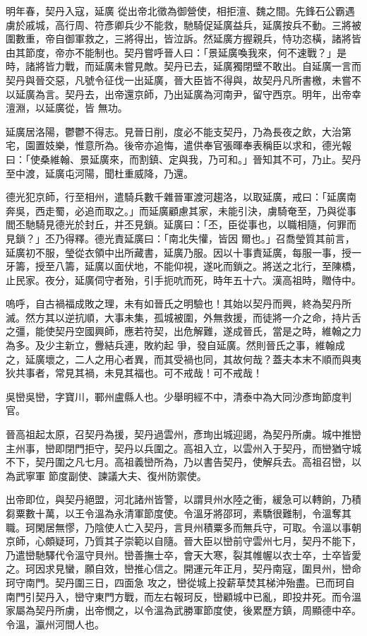 \begin{pinyinscope}
 明年春，契丹入寇，延廣
 從出帝北徵為御營使，相拒澶、魏之間。先鋒石公霸遇虜於戚城，高行周、符彥卿兵少不能救，馳騎促延廣益兵，延廣按兵不動。三將被圍數重，帝自御軍救之，三將得出，皆泣訴。然延廣方握親兵，恃功恣橫，諸將皆由其節度，帝亦不能制也。契丹嘗呼晉人曰：「景延廣喚我來，何不速戰？」是時，諸將皆力戰，而延廣未嘗見敵。契丹已去，延廣獨閉壁不敢出。自延廣一言而契丹與晉交惡，凡號令征伐一出延廣，晉大臣皆不得與，故契丹凡所書檄，未嘗不以延廣為言。契丹去，出帝還京師，乃出延廣為河南尹，留守西京。明年，出帝幸澶淵，以延廣從，皆
 無功。



 延廣居洛陽，鬱鬱不得志。見晉日削，度必不能支契丹，乃為長夜之飲，大治第宅，園置妓樂，惟意所為。後帝亦追悔，遣供奉官張暉奉表稱臣以求和，德光報曰：「使桑維翰、景延廣來，而割鎮、定與我，乃可和。」晉知其不可，乃止。契丹至中渡，延廣屯河陽，聞杜重威降，乃還。



 德光犯京師，行至相州，遣騎兵數千雜晉軍渡河趨洛，以取延廣，戒曰：「延廣南奔吳，西走蜀，必追而取之。」而延廣顧慮其家，未能引決，虜騎奄至，乃與從事閻丕馳騎見德光於封丘，并丕見鎖。延廣曰：「丕，臣從事也，以職相隨，何罪而見鎖？」丕乃得釋。德光責延廣曰：「南北失懽，皆因
 爾也。」召喬瑩質其前言，延廣初不服，瑩從衣領中出所藏書，延廣乃服。因以十事責延廣，每服一事，授一牙籌，授至八籌，延廣以面伏地，不能仰視，遂叱而鎖之。將送之北行，至陳橋，止民家。夜分，延廣伺守者殆，引手扼吭而死，時年五十六。漢高祖時，贈侍中。



 嗚呼，自古禍福成敗之理，未有如晉氏之明驗也！其始以契丹而興，終為契丹所滅。然方其以逆抗順，大事未集，孤城被圍，外無救援，而徒將一介之命，持片舌之彊，能使契丹空國興師，應若符契，出危解難，遂成晉氏，當是之時，維翰之力為多。及少主新立，釁結兵連，敗約起
 爭，發自延廣。然則晉氏之事，維翰成之，延廣壞之，二人之用心者異，而其受禍也同，其故何哉？蓋夫本末不順而與夷狄共事者，常見其禍，未見其福也。可不戒哉！可不戒哉！



 吳巒吳巒，字寶川，鄆州盧縣人也。少舉明經不中，清泰中為大同沙彥珣節度判官。



 晉高祖起太原，召契丹為援，契丹過雲州，彥珣出城迎謁，為契丹所虜。城中推巒主州事，巒即閉門拒守，契丹以兵圍之。高祖入立，以雲州入于契丹，而巒猶守城不下，契丹圍之凡七月。高祖義巒所為，乃以書告契丹，使解兵去。高祖召巒，以為武寧軍
 節度副使、諫議大夫、復州防禦使。



 出帝即位，與契丹絕盟，河北諸州皆警，以謂貝州水陸之衝，緩急可以轉餉，乃積芻粟數十萬，以王令溫為永清軍節度使。令溫牙將邵珂，素驕很難制，令溫奪其職。珂閑居無憀，乃陰使人亡入契丹，言貝州積粟多而無兵守，可取。令溫以事朝京師，心頗疑珂，乃質其子崇範以自隨。晉大臣以巒前守雲州七月，契丹不能下，乃遣巒馳驛代令溫守貝州。巒善撫士卒，會天大寒，裂其帷幄以衣士卒，士卒皆愛之。珂因求見蠻，願自效，巒推心信之。開運元年正月，契丹南寇，圍貝州，巒命珂守南門。契丹圍三日，四面急
 攻之，巒從城上投薪草焚其梯沖殆盡。已而珂自南門引契丹入，巒守東門方戰，而左右報珂反，巒顧城中已亂，即投井死。而令溫家屬為契丹所虜，出帝憫之，以令溫為武勝軍節度使，後累歷方鎮，周顯德中卒。令溫，瀛州河間人也。



\end{pinyinscope}